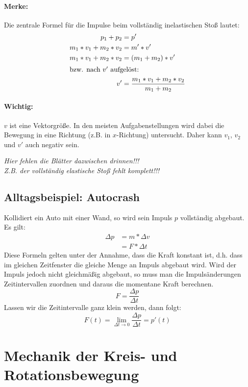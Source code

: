 	\paragraph{Merke:}
	Die zentrale Formel für die Impulse beim vollständig inelastischen Stoß lautet:
	\begin{align}
		p_1 + p_2 &= p'\\
		m_1*v_1+m_2*v_2 &= m'*v'\\
		m_1*v_1+m_2*v_2 &= (m_1+m_2)*v'\\
		\intertext{bzw. nach $ v' $ aufgelöst:}
		v' &= \dfrac{m_1*v_1+m_2*v_2}{m_1+m_2}
	\end{align}
	\paragraph{Wichtig:}
	$ v $ ist eine Vektorgröße. In den meisten Aufgabenstellungen wird dabei die Bewegung in eine Richtung (z.B. in $ x $-Richtung) untersucht. Daher kann $ v_1 $, $ v_2 $ und $ v' $ auch negativ sein.
	
	\emph{Hier fehlen die Blätter dazwischen drinnen!!!}\\
	\emph{Z.B. der vollständig elastische Stoß fehlt komplett!!!}
	
	\subsection{Alltagsbeispiel: Autocrash}
	Kollidiert ein Auto mit einer Wand, so wird sein Impuls $ p $ vollständig abgebaut. Es gilt:
	\begin{align}
		\Delta p &= m*\Delta v\\
		&= F*\Delta t
	\end{align}
	Diese Formeln gelten unter der Annahme, dass die Kraft konstant ist, d.h. dass im gleichen Zeitfenster die gleiche Menge an Impuls abgebaut wird. Wird der Impuls jedoch nicht gleichmäßig abgebaut, so muss man die Impulsänderungen Zeitintervallen zuordnen und daraus die momentane Kraft berechnen.
	\begin{equation}
		F = \dfrac{\Delta p}{\Delta t}
	\end{equation}
	Lassen wir die Zeitintervalle ganz klein werden, dann folgt:
	\begin{equation}
		F(t) = \lim\limits_{\Delta t\to 0}\dfrac{\Delta p}{\Delta t} = p'(t)
	\end{equation}
	
	\section{Mechanik der Kreis- und Rotationsbewegung}
